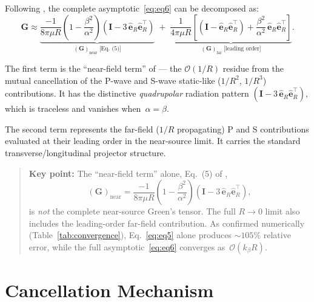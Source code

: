 \documentclass[11pt,a4paper]{article}
\newcommand{\bG}{\mathbf{G}}
\newcommand{\bI}{\mathbf{I}}
\newcommand{\beR}{\hat{\mathbf{e}}_R}
\newcommand{\order}[1]{\mathcal{O}\!\left(#1\right)}
\begin{document}
Following \citet{WuBenMenahem1985}, the complete
asymptotic~\eqref{eq:eq6} can be decomposed as:
\begin{equation}
  \bG \approx \underbrace{
    \frac{-1}{8\pi\mu R}
    \left(1 - \frac{\beta^2}{\alpha^2}\right)
    (\bI - 3\,\beR\beR^{\!\top})
  }_{\displaystyle (\bG)_\text{near} \;\text{[Eq.~(5)]}}
  \;+\;
  \underbrace{
    \frac{1}{4\pi\mu R}
    \left[
      (\bI - \beR\beR^{\!\top})
      + \frac{\beta^2}{\alpha^2}\,\beR\beR^{\!\top}
    \right]
  }_{\displaystyle (\bG)_\text{far} \;\text{[leading order]}}.
  \label{eq:decomp}
\end{equation}

The first term is the ``near-field term'' of \citet{WuBenMenahem1985}
--- the $\order{1/R}$ residue from the mutual cancellation of the
P-wave and S-wave static-like ($1/R^2$, $1/R^3$) contributions. It has the
distinctive \emph{quadrupolar} radiation pattern
$(\bI - 3\,\beR\beR^{\!\top})$, which is traceless and vanishes
when~$\alpha = \beta$.

The second term represents the far-field ($1/R$ propagating) P and S
contributions evaluated at their leading order in the near-source
limit. It carries the standard transverse/longitudinal projector structure.

\begin{quote}
\textbf{Key point:} The ``near-field term'' alone, Eq.~(5) of
\citet{WuBenMenahem1985},
\begin{equation}
  (\bG)_\text{near}
  = \frac{-1}{8\pi\mu R}
    \left(1 - \frac{\beta^2}{\alpha^2}\right)
    (\bI - 3\,\beR\beR^{\!\top}),
  \label{eq:eq5}
\end{equation}
is \emph{not} the complete near-source Green's tensor. The full
$R \to 0$ limit also includes the leading-order far-field
contribution. As confirmed numerically (Table~\ref{tab:convergence}),
Eq.~\eqref{eq:eq5} alone produces ${\sim}105\%$ relative error, while
the full asymptotic~\eqref{eq:eq6} converges as~$\order{k_\beta R}$.
\end{quote}

\section{Cancellation Mechanism}
\end{document}
